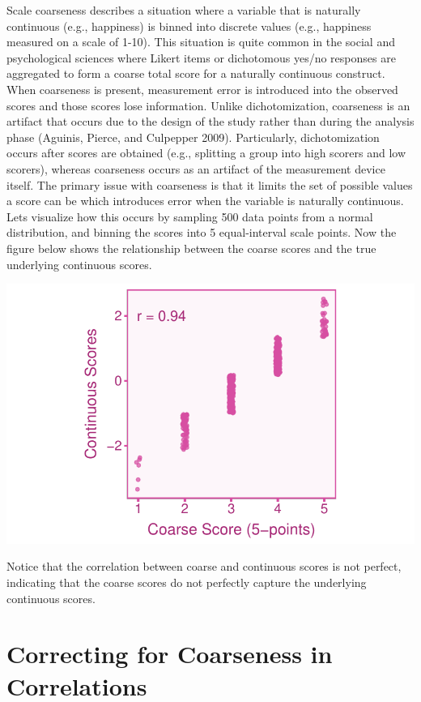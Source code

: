 \documentclass[
  letterpaper,
  DIV=11,
  numbers=noendperiod]{scrreprt}
\begin{document}
Scale coarseness describes a situation where a variable that is
naturally continuous (e.g., happiness) is binned into discrete values
(e.g., happiness measured on a scale of 1-10). This situation is quite
common in the social and psychological sciences where Likert items or
dichotomous yes/no responses are aggregated to form a coarse total score
for a naturally continuous construct. When coarseness is present,
measurement error is introduced into the observed scores and those
scores lose information. Unlike dichotomization, coarseness is an
artifact that occurs due to the design of the study rather than during
the analysis phase (Aguinis, Pierce, and Culpepper 2009). Particularly,
dichotomization occurs after scores are obtained (e.g., splitting a
group into high scorers and low scorers), whereas coarseness occurs as
an artifact of the measurement device itself. The primary issue with
coarseness is that it limits the set of possible values a score can be
which introduces error when the variable is naturally continuous. Lets
visualize how this occurs by sampling 500 data points from a normal
distribution, and binning the scores into 5 equal-interval scale points.
Now the figure below shows the relationship between the coarse scores
and the true underlying continuous scores.

\includegraphics{scale_coarseness_files/figure-pdf/unnamed-chunk-1-1.pdf}

Notice that the correlation between coarse and continuous scores is not
perfect, indicating that the coarse scores do not perfectly capture the
underlying continuous scores.

\hypertarget{correcting-for-coarseness-in-correlations}{%
\section{Correcting for Coarseness in
Correlations}\label{correcting-for-coarseness-in-correlations}}
\end{document}
